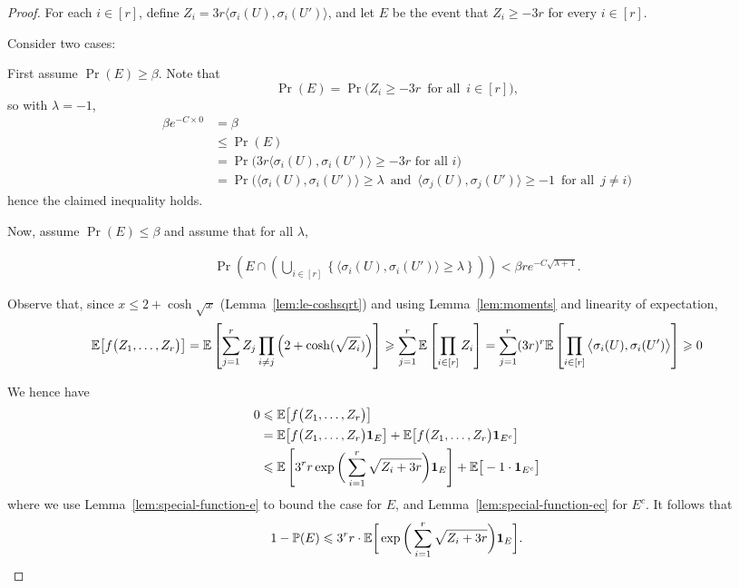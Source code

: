   \begin{proof}
    For each $i \in [r]$, define $Z_i = 3r\big\langle \sigma_i(U),\sigma_i(U') \big\rangle$, and let $E$ be the event that $Z_i \ge -3r$ for every $i \in [r]$.

    Consider two cases:

    First assume $\Pr(E) \ge \beta$. Note that
    $$\Pr(E) = \Pr\Big( Z_i \ge - 3r \, \text{ for all } \, i \in [r] \Big),$$
    so with $\lambda = -1$,
    \begin{align*}
      \beta e^{-C\times 0} &= \beta\\
      &\le \Pr(E)\\
      &= \Pr\Big(3r\big\langle \sigma_i(U),\sigma_i(U') \big\rangle \ge -3r \text{ for all }i\Big)\\
      &= \Pr\Big( \big\langle \sigma_i(U),\sigma_i(U') \big\rangle \ge \lambda \, \text{ and } \, \big\langle \sigma_j(U), \sigma_j(U') \big\rangle \ge -1 \, \text{ for all } \, j \ne i \Big)
    \end{align*}
    hence the claimed inequality holds.

    Now, assume $\Pr(E) \le \beta$ and assume that for all $\lambda$,

    \begin{align}\label{eq:max:big:and:E:no}
      \Pr\left(E \cap \left( \bigcup_{i \in [r]} \left\{ \big\langle \sigma_i(U),\sigma_i(U') \big\rangle \ge \lambda \right\}\right)\right) < \beta r e^{-C\sqrt{\lambda + 1}}.
    \end{align}

    Observe that, since $x \le 2 + \cosh\sqrt{x}$ (Lemma~\ref{lem:le-coshsqrt}) and using Lemma~\ref{lem:moments} and linearity of expectation,
    \[
      \mathbb{E}\big[ f\big( Z_1,\ldots,Z_r \big) \big] = \mathbb{E}\left[ \sum_{j = 1}^r Z_j \prod_{i \ne j} \left( 2 + \cosh(\sqrt{Z_i}) \right) \right]
      \geqslant \sum_{j = 1}^r \mathbb{E}\left[ \prod_{i \in [r]} Z_i \right] = \sum_{j = 1}^r (3r)^r \mathbb{E}\left[ \prod_{i \in [r]} \big\langle \sigma_i(U),\sigma_i(U') \big\rangle \right] \geqslant 0
    \]

    We hence have
    \begin{align*}
      0 &\leqslant \mathbb{E}\big[ f\big( Z_1,\ldots,Z_r \big) \big]\\
      &= \mathbb{E}\big[ f\big( Z_1,\ldots,Z_r \big)  \mathbf{1}_E \big] + \mathbb{E}\big[ f\big( Z_1,\ldots,Z_r \big) \mathbf{1}_{E^c} \big]\\
      &\leqslant \mathbb{E}\left[ 3^r r \exp\bigg( \displaystyle\sum_{i = 1}^r \sqrt{ Z_i + 3r } \bigg)  \mathbf{1}_E \right] + \mathbb{E}\big[-1 \cdot \mathbf{1}_{E^c} \big]
    \end{align*}
    where we use Lemma~\ref{lem:special-function-e} to bound the case for $E$, and Lemma~\ref{lem:special-function-ec} for $E^c$.
    It follows that
    \begin{equation}\label{eq:eventE:inequality}
      1 - \mathbb{P}(E) \leqslant 3^r r \cdot \mathbb{E}\bigg[ \exp\bigg( \sum_{i = 1}^r \sqrt{ Z_i + 3r } \bigg) \mathbf{1}_E \bigg].
    \end{equation}


\end{proof}

